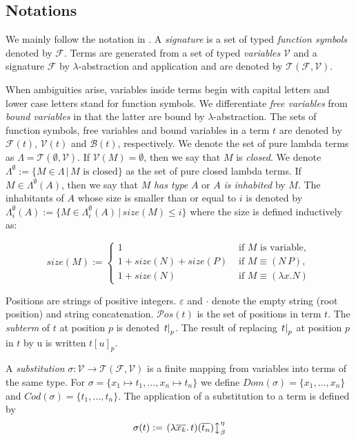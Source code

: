 \subsection{Notations}
\label{notations}
We mainly follow the notation in \cite{Montano-Rivas:eswa}. A {\em signature} is a set of typed {\em function symbols} denoted by $\mathcal{F}$. Terms are generated from a set of typed {\em variables} $\mathcal{V}$ and a signature $\mathcal{F}$ 
by $\lambda$-abstraction and application and are denoted by $\mathcal{T}(\mathcal{F},\mathcal{V})$.

When ambiguities arise, variables inside terms begin with capital letters and lower case letters stand for function symbols. We differentiate {\em free variables} from {\em bound variables} in that the latter are bound by $\lambda$-abstraction. The sets of function symbols, free variables and bound variables in a term $t$ are denoted by $\mathcal{F}(t)$, $\mathcal{V}(t)$ and $\mathcal{B}(t)$, respectively. We denote the set of pure lambda terms as $\Lambda = \mathcal{T}(\emptyset,\mathcal{V})$. If $\mathcal{V}(M)=\emptyset$, then we say that $M$ is {\em closed}. We denote $\Lambda^{\emptyset} := \{M\in\Lambda\,|\,M\textrm{ is closed}\}$ as the set of pure closed lambda terms. If $M\in\Lambda^{\emptyset}(A)$, then we say that $M$ {\em has type} $A$ or $A$ {\em is inhabited} by $M$. The inhabitants of $A$ whose size is smaller than or equal to $i$ is denoted by $\Lambda_i^{\emptyset}(A):=\{M \in \Lambda_i^{\emptyset}(A)\,|\,size(M)\le i\}$ where the size is defined inductively as:

$$
size(M) := \left\{
  \begin{array}{ll}
    1 & \textrm{   if } M \textrm{ is variable,}\\
    1 + size(N) + size(P) & \textrm{  if } M \equiv (N\,P),\\
    1 + size(N) & \textrm{   if } M \equiv (\lambda x. N)
  \end{array}\right.
$$

Positions are strings of positive integers. $\varepsilon$ and $\cdot$ denote the empty string (root position) and string concatenation. $\mathcal{P}os(t)$ is the set of positions in term $t$. The {\em subterm} of $t$ at position $p$ is denoted $\left. t \right|_{p}$. The result of replacing $\left. t \right|_{p}$ at position $p$ in $t$ by u is written $t[u]_{p}$.

A {\em substitution} $\sigma : \mathcal{V} \to \mathcal{T}(\mathcal{F},\mathcal{V})$ is a finite mapping from variables into terms of the same type. For $\sigma = \{x_1 \mapsto t_1,\ldots,x_n \mapsto t_n\}$ we define $Dom(\sigma) = \{x_1,\ldots,x_n\}$ and $Cod(\sigma) = \{t_1,\ldots,t_n\}$. The application of a substitution to a term is defined by 
$$\sigma(t) := \left. (\lambda \overline{x_k}.\, t)(\overline{t_n}) \right\updownarrow^{\eta}_{\beta}$$

